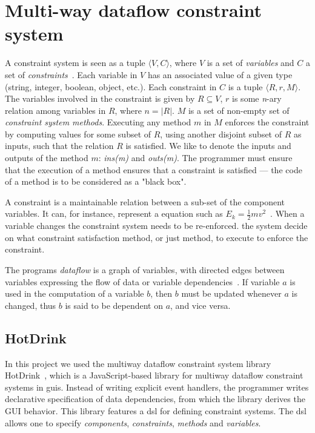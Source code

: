 \chapter{Multi-way dataflow constraint system}
\label{chap:constraint-systems}

A constraint system is seen as a tuple ${\langle V, C \rangle}$, where $V$ is a set of \textit{variables} and $C$ a set of \textit{constraints}~\cite{jarvi_algorithms_2009}. Each variable in $V$ has an associated value of a given type (string, integer, boolean, object, etc.). Each constraint in $C$ is a tuple ${\langle R, r, M \rangle}$. The variables involved in the constraint is given by ${R \subseteq V}$, $r$ is some \textit{n}-ary relation among variables in $R$, where ${n = \lvert R \rvert}$. $M$ is a set of non-empty set of \textit{constraint system methods}. Executing any method $m$ in $M$ enforces the constraint by computing values for some subset of $R$, using another disjoint subset of $R$ as inputs, such that the relation $R$ is satisfied. We like to denote the inputs and outputs of the method $m$: \textit{ins(m)} and \textit{outs(m)}. The programmer must ensure that the execution of a method ensures that a constraint is satisfied --- the code of a method is to be considered as a "black box". 

A constraint is a maintainable relation between a sub-set of the component variables. It can, for instance, represent a equation such as  $E_k = \frac{1}{2}mv^2$~\cite{svartveit2021multithreaded}. When a variable changes the constraint system needs to be re-enforced. the system decide on what constraint satisfaction method, or just method, to execute to enforce the constraint.

The programs \textit{dataflow} is a graph of variables, with directed edges between variables expressing the flow of data or variable dependencies~\cite{stokke2020declaratively}. If variable $a$ is used in the computation of a variable $b$, then $b$ must be updated whenever $a$ is changed, thus $b$ is said to be dependent on $a$, and vice versa.

\section{HotDrink}
\label{sec:hotdrink}

In this project we used the multiway dataflow constraint system library 
HotDrink~\cite{HotDrink}, which is a JavaScript-based library for multiway dataflow constraint systems in \gls{gui}s. Instead of writing explicit event handlers, the programmer writes declarative specification of data dependencies, from which the library derives the GUI behavior. This library features a \gls{dsl} for defining constraint systems. The \gls{dsl} allows one to specify \emph{components}, \emph{constraints}, \emph{methods} and \emph{variables}. 

